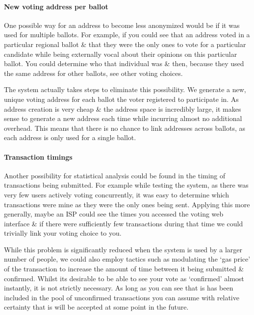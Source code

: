 \documentclass{article}
\begin{document}
	\paragraph{New voting address per ballot}
	\hfill \break \break
	One possible way for an address to become less anonymized would be if it was used for multiple ballots. For example, if you could see that an address voted in a particular regional ballot \& that they were the only ones to vote for a particular candidate while being externally vocal about their opinions on this particular ballot. You could determine who that individual was \& then, because they used the same address for other ballots, see other voting choices.
	
	The system actually takes steps to eliminate this possibility. We generate a new, unique voting address for each ballot the voter registered to participate in. As address creation is very cheap \& the address space is incredibly large, it makes sense to generate a new address each time while incurring almost no additional overhead. This means that there is no chance to link addresses across ballots, as each address is only used for a single ballot.
	
	\cleardoublepage
	\paragraph{Transaction timings}
	\hfill \break \break
	Another possibility for statistical analysis could be found in the timing of transactions being submitted. For example while testing the system, as there was very few users actively voting concurrently, it was easy to determine which transactions were mine as they were the only ones being sent. Applying this more generally, maybe an ISP could see the times you accessed the voting web interface \& if there were sufficiently few transactions during that time we could trivially link your voting choice to you.
	
	While this problem is significantly reduced when the system is used by a larger number of people, we could also employ tactics such as modulating the `gas price' of the transaction to increase the amount of time between it being submitted \& confirmed. Whilst its desirable to be able to see your vote as `confirmed' almost instantly, it is not strictly necessary. As long as you can see that is has been included in the pool of unconfirmed transactions you can assume with relative certainty that is will be accepted at some point in the future.
    
\end{document}
